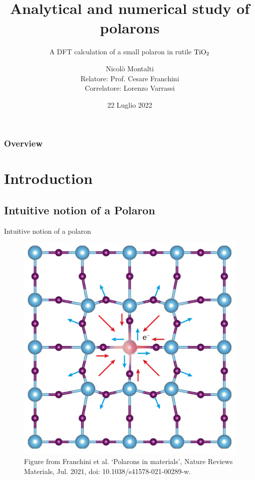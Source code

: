 \documentclass[11pt, xcolor=dvipsnames, aspectratio=43]{beamer}
\title{Analytical and numerical study of polarons}
\subtitle{A DFT calculation of a small polaron in rutile $\ce{TiO_2}$}
\author[Nicolò Montalti]{Nicolò Montalti \\[3mm]\footnotesize{Relatore: Prof. Cesare Franchini \\ Correlatore: Lorenzo Varrassi}}
\date[22/07/2022]{22 Luglio 2022}
\institute[University of Bologna]{Laurea in Fisica\\Università di Bologna}
\begin{document}
\begin{frame}
    \maketitle
\end{frame}

\begin{frame}
    \frametitle{Overview}
    \tableofcontents
\end{frame}

\section{Introduction}

\subsection{Intuitive notion of a Polaron}
\begin{frame}{Intuitive notion of a polaron}
    \begin{figure}
        \centering
        \includegraphics[height=0.7\textheight]{figures/polaron_lattice.png}
        \caption{Figure from Franchini et al. ‘Polarons in materials’, Nature Reviews Materials, Jul. 2021, doi: 10.1038/s41578-021-00289-w.
        }
    \end{figure}
\end{frame}
\end{document}
